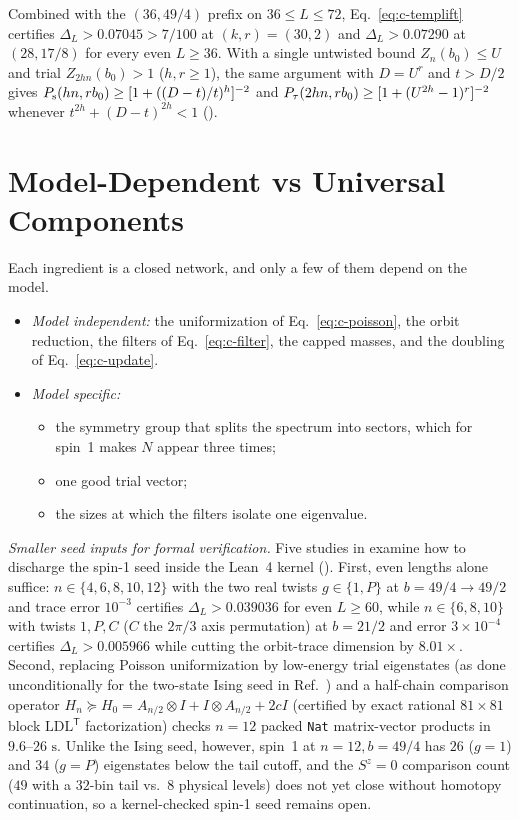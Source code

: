 \documentclass[aps,prl,reprint,amsmath,amssymb,nofootinbib,raggedbottom]{revtex4-2}
\begin{document}
Combined with the $(36,49/4)$ prefix on $36\le L\le72$, Eq.~\eqref{eq:c-templift}
certifies $\Delta_L>0.07045>7/100$ at $(k,r)=(30,2)$ and $\Delta_L>0.07290$ at
$(28,17/8)$ for every even $L\ge36$. With a single untwisted bound
$Z_n(b_0)\le U$ and trial $Z_{2hn}(b_0)>1$ ($h,r\ge1$), the same argument with
$D=U^r$ and $t>D/2$ gives $P_{\mathrm s}(hn,rb_0)\ge[1+((D-t)/t)^h]^{-2}$ and
$P_{\tau}(2hn,rb_0)\ge[1+(U^{2h}-1)^r]^{-2}$ whenever $t^{2h}+(D-t)^{2h}<1$
().

\section{Model-Dependent vs Universal Components}\label{app:c-general}
Each ingredient is a closed network, and only a few of them depend on the
model.
\begin{itemize}
\item \emph{Model independent:} the uniformization of Eq.~\eqref{eq:c-poisson},
the orbit reduction, the filters of Eq.~\eqref{eq:c-filter}, the capped
masses, and the doubling of Eq.~\eqref{eq:c-update}.
\item \emph{Model specific:}
 \begin{itemize}
 \item the symmetry group that splits the spectrum into sectors, which
 for spin~1 makes $N$ appear three times;
 \item one good trial vector;
 \item the sizes at which the filters isolate one eigenvalue.
 \end{itemize}
\end{itemize}

\emph{Smaller seed inputs for formal verification.}
Five studies in  examine how to discharge the spin-1
seed inside the Lean~4 kernel (). First, even lengths
alone suffice: $n\in\{4,6,8,10,12\}$ with the two real twists $g\in\{1,P\}$ at
$b=49/4\to49/2$ and trace error $10^{-3}$ certifies $\Delta_L>0.039036$ for even
$L\ge60$, while $n\in\{6,8,10\}$ with twists $1,P,C$ ($C$ the $2\pi/3$ axis
permutation) at $b=21/2$ and error $3\times10^{-4}$ certifies
$\Delta_L>0.005966$ while cutting the orbit-trace dimension by $8.01\times$.
Second, replacing Poisson uniformization by low-energy trial eigenstates
 (as done unconditionally for the two-state Ising seed in
Ref.~\cite{scope}) and a half-chain comparison operator
$H_n\succeq H_0=A_{n/2}\otimes I+I\otimes A_{n/2}+2cI$ (certified by exact
rational $81\times81$ block $\mathrm{LDL}^{\mathsf T}$ factorization) checks
$n=12$ packed \texttt{Nat} matrix-vector products in $9.6\text{--}26\text{ s}$.
Unlike the Ising seed, however, spin~1 at $n=12,b=49/4$ has $26$ ($g=1$) and
$34$ ($g=P$) eigenstates below the tail cutoff, and the $S^z=0$ comparison count
($49$ with a $32$-bin tail vs.\ $8$ physical levels) does not yet close without
homotopy continuation, so a kernel-checked spin-1 seed remains open.
\end{document}
